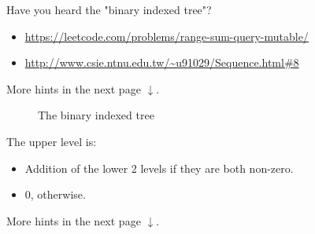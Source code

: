 \documentclass[12pt,a4paper]{article}
\begin{document}
Have you heard the "binary indexed tree"?

\begin{itemize}
\item \url{https://leetcode.com/problems/range-sum-query-mutable/}
\item \url{http://www.csie.ntnu.edu.tw/~u91029/Sequence.html#8}
\end{itemize}

\vspace{3cm}
More hints in the next page $\downarrow$.

\pagebreak

\begin{figure}[H]
\centering
{}
\caption{The binary indexed tree}
\end{figure}

The upper level is:
\begin{itemize}
\item Addition of the lower 2 levels if they are both non-zero.
\item 0, otherwise.
\end{itemize}

\vspace{3cm}
More hints in the next page $\downarrow$.

\pagebreak
\end{document}
